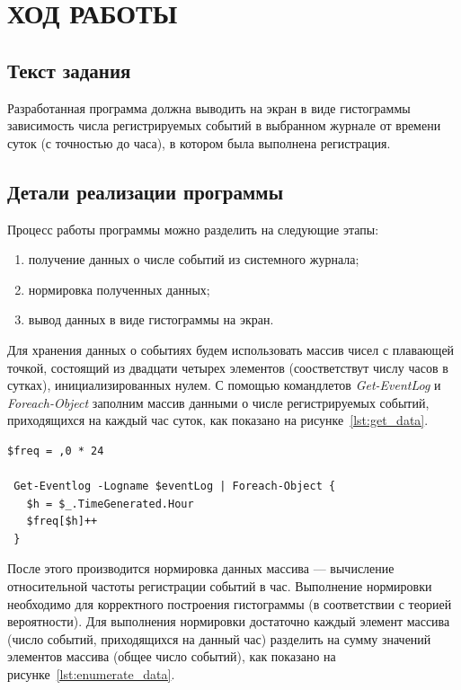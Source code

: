 \section{ХОД РАБОТЫ}

\subsection{Текст задания}

Разработанная программа должна выводить на экран в виде гистограммы зависимость
числа регистрируемых событий в выбранном журнале от времени суток (с точностью до часа),
в котором была выполнена регистрация.

\subsection{Детали реализации программы}

Процесс работы программы можно разделить на следующие этапы:

\begin{enumerate}
\item получение данных о числе событий из системного журнала;
\item нормировка полученных данных;
\item вывод данных в виде гистограммы на экран.
\end{enumerate}

Для хранения данных о событиях будем использовать массив чисел с плавающей точкой,
состоящий из двадцати четырех элементов (соостветствут числу часов в сутках),
инициализированных нулем.
С помощью командлетов \textit{Get-EventLog} и \textit{Foreach-Object} заполним
массив данными о числе 
регистрируемых событий, приходящихся на каждый час суток, как показано 
на рисунке~\ref{lst:get_data}.

\begin{lstlisting}[caption=Получение данных о числе событий,label=lst:get_data]
 $freq = ,0 * 24
 
 Get-Eventlog -Logname $eventLog | Foreach-Object {
   $h = $_.TimeGenerated.Hour
   $freq[$h]++
 }
\end{lstlisting}

После этого производится нормировка данных массива --- вычисление относительной 
частоты регистрации событий в час.
Выполнение нормировки необходимо для корректного построения гистограммы 
(в соответствии с теорией вероятности).
Для выполнения нормировки достаточно каждый элемент массива (число событий,
приходящихся на данный час) разделить на сумму значений элементов 
массива (общее число событий), как показано на рисунке~\ref{lst:enumerate_data}.

